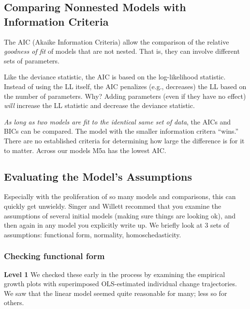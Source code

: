 \documentclass[
  english,
]{book}
\begin{document}
\hypertarget{comparing-nonnested-models-with-information-criteria}{%
\subsection{Comparing Nonnested Models with Information Criteria}\label{comparing-nonnested-models-with-information-criteria}}

The AIC (Akaike Information Criteria) allow the comparison of the relative \emph{goodness of fit} of models that are not nested. That is, they can involve different sets of parameters.

Like the deviance statistic, the AIC is based on the log-likelihood statistic. Instead of using the LL itself, the AIC penalizes (e.g., decreases) the LL based on the number of parameters. Why? Adding parameters (even if they have no effect) \emph{will} increase the LL statistic and decrease the deviance statistic.

\emph{As long as two models are fit to the identical same set of data}, the AICs and BICs can be compared. The model with the smaller information critera ``wins.'' There are no established criteria for determining how large the difference is for it to matter. Across our models M5a has the lowest AIC.

\hypertarget{evaluating-the-models-assumptions}{%
\subsection{Evaluating the Model's Assumptions}\label{evaluating-the-models-assumptions}}

Especially with the proliferation of so many models and comparisons, this can quickly get unwieldy. Singer and Willett \citeyearpar{singer_applied_2003} recommed that you examine the assumptions of several initial models (making sure things are looking ok), and then again in any model you explicitly write up. We briefly look at 3 sets of assumptions: functional form, normality, homoschedasticity.

\hypertarget{checking-functional-form}{%
\subsubsection{Checking functional form}\label{checking-functional-form}}

\textbf{Level 1} We checked these early in the process by examining the empirical growth plots with superimposed OLS-estimated individual change trajectories. We saw that the linear model seemed quite reasonable for many; less so for others.
\end{document}
